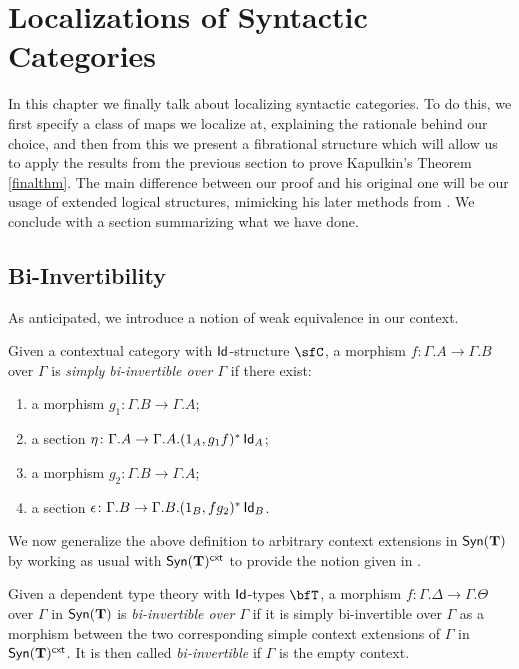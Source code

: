 \chapter{Localizations of Syntactic Categories}\label{chapter4}

In this chapter we finally talk about localizing syntactic categories. To do
this, we first specify a class of maps we localize at, explaining the rationale
behind our choice, and then from this we present a fibrational structure which
will allow us to apply the results from the previous section to prove Kapulkin's
Theorem \ref{finalthm}. The main difference between our proof and his
original one \cite{Kap14} will be our usage of extended logical structures,
mimicking his later methods from \cite{Kap17}. We conclude with a section
summarizing what we have done.

\section{Bi-Invertibility}

As anticipated, we introduce a notion of weak equivalence in our context.

\begin{defn}
  Given a contextual category with $\operatorname{\mathsf{Id}}$-structure $\sfC$, a morphism
  $f\colon\Gamma.A\rightarrow\Gamma.B$ over $\Gamma$ is \emph{simply
    bi-invertible over $\Gamma$} if there exist:
  \begin{enumerate}
    \item a morphism $g_1\colon\Gamma.B\rightarrow\Gamma.A$;
    \item a section
      $\eta\colon\Gamma.A\rightarrow\Gamma.A.(1_{A},g_1f)^*\operatorname{\mathsf{Id}}_{A}$;
    \item a morphism $g_2\colon\Gamma.B\rightarrow\Gamma.A$;
    \item a section
      $\epsilon\colon\Gamma.B\rightarrow\Gamma.B.(1_{B},fg_2)^*\operatorname{\mathsf{Id}}_{B}$.
  \end{enumerate}
\end{defn}

We now generalize the above definition to arbitrary context extensions in
$\mathsf{Syn}(\mathbf{T})$ by working as usual with $\mathsf{Syn}(\mathbf{T})^{\operatorname{\mathsf{cxt}}}$ to provide the notion given
in \cite[Def.~1.4]{Kap17}.

\begin{defn}
  Given a dependent type theory with $\operatorname{\mathsf{Id}}$-types $\bfT$, a morphism
  $f\colon\Gamma.\Delta\rightarrow\Gamma.\Theta$ over $\Gamma$ in $\mathsf{Syn}(\mathbf{T})$ is
  \emph{bi-invertible over $\Gamma$} if it is simply bi-invertible over $\Gamma$
  as a morphism between the two corresponding simple context extensions of
  $\Gamma$ in $\mathsf{Syn}(\mathbf{T})^{\operatorname{\mathsf{cxt}}}$. It is then called \emph{bi-invertible} if
  $\Gamma$ is the empty context.
\end{defn}

